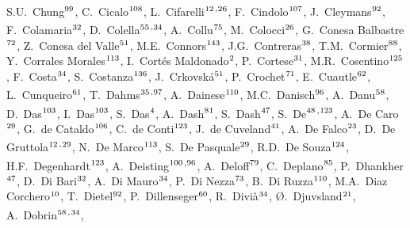 \begin{flushleft}
S.U.~Chung$^\textrm{\scriptsize 99}$,
C.~Cicalo$^\textrm{\scriptsize 108}$,
L.~Cifarelli$^\textrm{\scriptsize 12}$\textsuperscript{,}$^\textrm{\scriptsize 26}$,
F.~Cindolo$^\textrm{\scriptsize 107}$,
J.~Cleymans$^\textrm{\scriptsize 92}$,
F.~Colamaria$^\textrm{\scriptsize 32}$,
D.~Colella$^\textrm{\scriptsize 55}$\textsuperscript{,}$^\textrm{\scriptsize 34}$,
A.~Collu$^\textrm{\scriptsize 75}$,
M.~Colocci$^\textrm{\scriptsize 26}$,
G.~Conesa Balbastre$^\textrm{\scriptsize 72}$,
Z.~Conesa del Valle$^\textrm{\scriptsize 51}$,
M.E.~Connors$^\textrm{\scriptsize 143}$,
J.G.~Contreras$^\textrm{\scriptsize 38}$,
T.M.~Cormier$^\textrm{\scriptsize 88}$,
Y.~Corrales Morales$^\textrm{\scriptsize 113}$,
I.~Cort\'{e}s Maldonado$^\textrm{\scriptsize 2}$,
P.~Cortese$^\textrm{\scriptsize 31}$,
M.R.~Cosentino$^\textrm{\scriptsize 125}$,
F.~Costa$^\textrm{\scriptsize 34}$,
S.~Costanza$^\textrm{\scriptsize 136}$,
J.~Crkovsk\'{a}$^\textrm{\scriptsize 51}$,
P.~Crochet$^\textrm{\scriptsize 71}$,
E.~Cuautle$^\textrm{\scriptsize 62}$,
L.~Cunqueiro$^\textrm{\scriptsize 61}$,
T.~Dahms$^\textrm{\scriptsize 35}$\textsuperscript{,}$^\textrm{\scriptsize 97}$,
A.~Dainese$^\textrm{\scriptsize 110}$,
M.C.~Danisch$^\textrm{\scriptsize 96}$,
A.~Danu$^\textrm{\scriptsize 58}$,
D.~Das$^\textrm{\scriptsize 103}$,
I.~Das$^\textrm{\scriptsize 103}$,
S.~Das$^\textrm{\scriptsize 4}$,
A.~Dash$^\textrm{\scriptsize 81}$,
S.~Dash$^\textrm{\scriptsize 47}$,
S.~De$^\textrm{\scriptsize 48}$\textsuperscript{,}$^\textrm{\scriptsize 123}$,
A.~De Caro$^\textrm{\scriptsize 29}$,
G.~de Cataldo$^\textrm{\scriptsize 106}$,
C.~de Conti$^\textrm{\scriptsize 123}$,
J.~de Cuveland$^\textrm{\scriptsize 41}$,
A.~De Falco$^\textrm{\scriptsize 23}$,
D.~De Gruttola$^\textrm{\scriptsize 12}$\textsuperscript{,}$^\textrm{\scriptsize 29}$,
N.~De Marco$^\textrm{\scriptsize 113}$,
S.~De Pasquale$^\textrm{\scriptsize 29}$,
R.D.~De Souza$^\textrm{\scriptsize 124}$,
H.F.~Degenhardt$^\textrm{\scriptsize 123}$,
A.~Deisting$^\textrm{\scriptsize 100}$\textsuperscript{,}$^\textrm{\scriptsize 96}$,
A.~Deloff$^\textrm{\scriptsize 79}$,
C.~Deplano$^\textrm{\scriptsize 85}$,
P.~Dhankher$^\textrm{\scriptsize 47}$,
D.~Di Bari$^\textrm{\scriptsize 32}$,
A.~Di Mauro$^\textrm{\scriptsize 34}$,
P.~Di Nezza$^\textrm{\scriptsize 73}$,
B.~Di Ruzza$^\textrm{\scriptsize 110}$,
M.A.~Diaz Corchero$^\textrm{\scriptsize 10}$,
T.~Dietel$^\textrm{\scriptsize 92}$,
P.~Dillenseger$^\textrm{\scriptsize 60}$,
R.~Divi\`{a}$^\textrm{\scriptsize 34}$,
{\O}.~Djuvsland$^\textrm{\scriptsize 21}$,
A.~Dobrin$^\textrm{\scriptsize 58}$\textsuperscript{,}$^\textrm{\scriptsize 34}$,

\end{flushleft}
